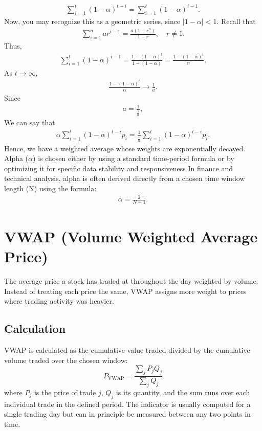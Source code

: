 \documentclass[letterpaper, 11pt]{article}
\newcommand{\1}{\mathds{1}}		%
\theoremstyle{definition}
\begin{document}
    \begin{align*}
        \sum_{i=1}^{t}(1-\alpha)^{t-i} = \sum_{i=1}^{t}(1-\alpha)^{i-1}
    .\end{align*}
    Now, you may recognize this as a geometric series, since $\left\lvert 1-\alpha \right\rvert < 1$. Recall that
    \begin{align*}
        \sum_{i=1}^{n}ar^{i-1} = \frac{a(1-r^{n})}{1-r}, \quad r\ne 1
    .\end{align*}
    Thus,
    \begin{align*}
        \sum_{i=1}^{t}(1-\alpha)^{i-1} = \frac{1-(1-\alpha)^{t}}{1-(1-\alpha)} = \frac{1-(1-\alpha)^{t}}{\alpha}
    .\end{align*}
    As $t \to \infty$, 
    \begin{align*}
        \frac{1-(1-\alpha)^{t}}{\alpha} \to \frac{1}{a}
    .\end{align*}
    Since 
    \begin{align*}
        a = \frac{1}{\frac{1}{\alpha}}
    ,\end{align*}
    We can say that
    \begin{align*}
        \alpha \sum_{i=1}^{t}(1-\alpha)^{t-i}p_{i} =  \frac{1}{\frac{1}{\alpha}} \sum_{i=1}^{t}(1-\alpha)^{t-i}p_{i}
    .\end{align*}
    Hence, we have a weighted average whose weights are exponentially decayed.
    \bigbreak \noindent 
    Alpha ($\alpha$) is chosen either by using a standard time-period formula or by optimizing it for specific data stability and responsiveness
    \bigbreak \noindent 
    In finance and technical analysis, alpha is often derived directly from a chosen time window length (N) using the formula:
    \begin{align*}
        \alpha = \frac{2}{N+1}
    .\end{align*}








    \pagebreak \noindent
    \section{VWAP (Volume Weighted Average Price)}
    The average price a stock has traded at throughout the day weighted by volume.
    Instead of treating each price the same, VWAP assigns more weight to prices where trading activity was heavier.
    \subsection{Calculation}
    VWAP is calculated as the cumulative value traded divided by the cumulative volume traded over the chosen window:
    $$ P_{\text{VWAP}} = \frac{\sum_{j}P_jQ_j}{\sum_{j}Q_j}$$
    where $P_j$ is the price of trade $j$, $Q_j$ is its quantity, and the sum runs over each individual trade in the defined period.
    \bigbreak \noindent
    The indicator is usually computed for a single trading day but can in principle be measured between any two points in time.
\end{document}
